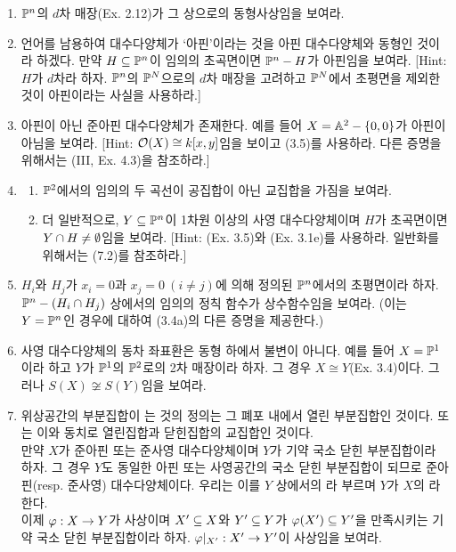 \begin{enumerate}[label=\tb{3.\arabic*.},itemindent=0mm,itemsep=2mm]
\begin{enumerate}[label=(\alph*)]
	\end{enumerate}
	\item $\mathbb{P}^n$의 $d$차 매장(Ex. 2.12)가 그 상으로의 동형사상임을 보여라.
	\item 언어를 남용하여 대수다양체가 `아핀'이라는 것을 아핀 대수다양체와 동형인 것이라 하겠다.
	만약 $H\subseteq\mathbb{P}^n$이 임의의 초곡면이면 $\mathbb{P}^n-H$가 아핀임을 보여라. [Hint: $H$가 $d$차라 하자.
	$\mathbb{P}^n$의 $\mathbb{P}^N$으로의 $d$차 매장을 고려하고 $\mathbb{P}^N$에서 초평면을 제외한 것이 아핀이라는 사실을 사용하라.]
	\item 아핀이 아닌 준아핀 대수다양체가 존재한다. 예를 들어 $X=\mathbb{A}^2-\{0,0\}$가 아핀이 아님을 보여라.
	[Hint: $\mathcal{O}(X)\cong k[x,y]$임을 보이고 (3.5)를 사용하라. 다른 증명을 위해서는 (III, Ex. 4.3)을 참조하라.]
	\item \begin{enumerate}[label=(\alph*)]
	\item $\mathbb{P}^2$에서의 임의의 두 곡선이 공집합이 아닌 교집합을 가짐을 보여라.
	\item 더 일반적으로, $Y\subseteq\mathbb{P}^n$이 1차원 이상의 사영 대수다양체이며 $H$가 초곡면이면 $Y\cap H\ne\emptyset$임을 보여라.
	[Hint: (Ex. 3.5)와 (Ex. 3.1e)를 사용하라. 일반화를 위해서는 (7.2)를 참조하라.]
	\end{enumerate}
	\item $H_i$와 $H_j$가 $x_i=0$과 $x_j=0\:(i\ne j)$에 의해 정의된 $\mathbb{P}^n$에서의 초평면이라 하자.
	$\mathbb{P}^n-(H_i\cap H_j)$ 상에서의 임의의 정칙 함수가 상수함수임을 보여라. (이는 $Y=\mathbb{P}^n$인 경우에 대하여 (3.4a)의 다른 증명을 제공한다.)
	\item 사영 대수다양체의 동차 좌표환은 동형 하에서 불변이 아니다.
	예를 들어 $X=\mathbb{P}^1$이라 하고 $Y$가 $\mathbb{P}^1$의 $\mathbb{P}^2$로의 2차 매장이라 하자.
	그 경우 $X\cong Y$(Ex. 3.4)이다. 그러나 $S(X)\not\cong S(Y)$임을 보여라.
	\item {} 위상공간의 부분집합이 는 것의 정의는
	그 폐포 내에서 열린 부분집합인 것이다. 또는 이와 동치로 열린집합과 닫힌집합의 교집합인 것이다.\\
	만약 $X$가 준아핀 또는 준사영 대수다양체이며 $Y$가 기약 국소 닫힌 부분집합이라 하자.
	그 경우 $Y$도 동일한 아핀 또는 사영공간의 국소 닫힌 부분집합이 되므로 준아핀(resp. 준사영) 대수다양체이다.
	우리는 이를 $Y$ 상에서의 라 부르며 $Y$가 $X$의 라 한다.\\
	이제 $\varphi:X\rightarrow Y$가 사상이며 $X'\subseteq X$와 $Y'\subseteq Y$가 $\varphi(X')\subseteq Y'$을 만족시키는 기약 국소 닫힌 부분집합이라 하자.
	$\varphi|_{X'}:X'\rightarrow Y'$이 사상임을 보여라.

\end{enumerate}
